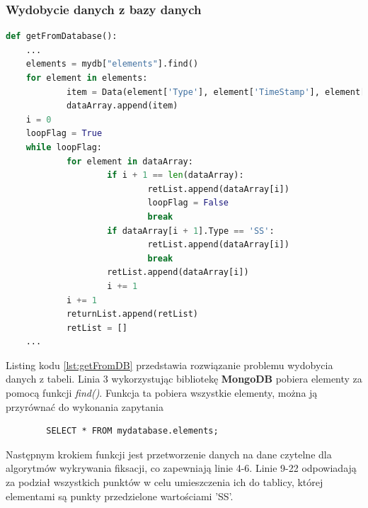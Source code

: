 \subsubsection{Wydobycie danych z bazy danych}
\label{ssec:getDB}
\begin{lstlisting}[language=Python, caption=Wydobycie danych z bazy danych, label={lst:getFromDB}]
def getFromDatabase():
    ...
    elements = mydb["elements"].find()
    for element in elements:
            item = Data(element['Type'], element['TimeStamp'], element['CoordX'], element['CoordY'])
            dataArray.append(item)
    i = 0
    loopFlag = True
    while loopFlag:
            for element in dataArray:
                    if i + 1 == len(dataArray):
                            retList.append(dataArray[i])
                            loopFlag = False
                            break
                    if dataArray[i + 1].Type == 'SS':
                            retList.append(dataArray[i])
                            break
                    retList.append(dataArray[i])
                    i += 1
            i += 1
            returnList.append(retList)
            retList = []
    ...
    \end{lstlisting}
Listing kodu \ref{lst:getFromDB} przedstawia rozwiązanie problemu wydobycia danych z tabeli. Linia 3 wykorzystując bibliotekę \textbf{MongoDB} pobiera elementy za pomocą funkcji \emph{find()}. Funkcja ta pobiera wszystkie elementy, można ją przyrównać do wykonania zapytania 
\begin{verbatim}
        SELECT * FROM mydatabase.elements;
\end{verbatim}
Następnym krokiem funkcji jest przetworzenie danych na dane czytelne dla algorytmów wykrywania fiksacji, co zapewniają linie 4-6. Linie 9-22 odpowiadają za podział wszystkich punktów w celu umieszczenia ich do tablicy, której elementami są punkty przedzielone wartościami 'SS'.

